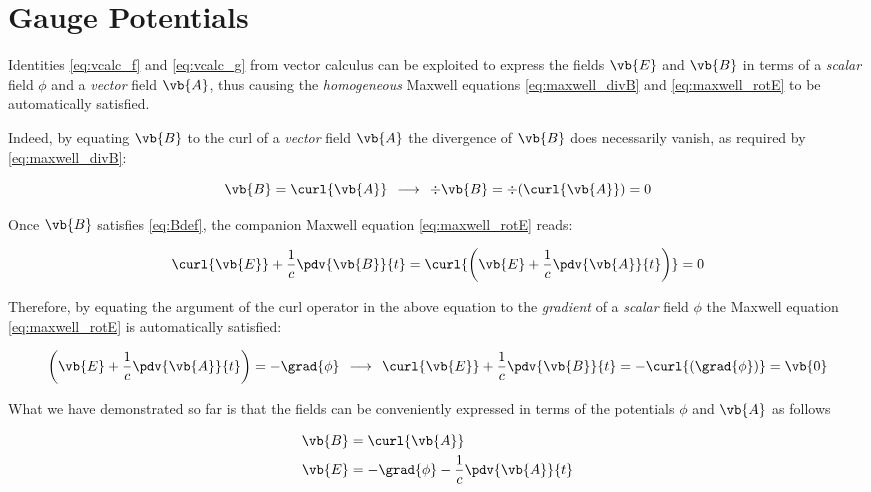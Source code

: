 \section{Gauge Potentials}

Identities \ref{eq:vcalc_f} and \ref{eq:vcalc_g} from vector calculus can be exploited to express the fields $\vb{E}$ and $\vb{B}$ in terms of a \textit{scalar} field $\phi$ and a \textit{vector} field $\vb{A}$, thus causing the \textit{homogeneous} Maxwell equations \ref{eq:maxwell_divB} and \ref{eq:maxwell_rotE} to be automatically satisfied. 

Indeed, by equating $\vb{B}$ to the curl of a \textit{vector} field $\vb{A}$ the divergence of $\vb{B}$ does necessarily vanish, as required by \ref{eq:maxwell_divB}:

\begin{equation}
\vb{B} = \curl{\vb{A}} \:\: \longrightarrow \:\: \div{\vb{B}} = \div{(\curl{\vb{A}})} = 0 \label{eq:Bdef}
\end{equation}
   
Once $\vb{B}$ satisfies \ref{eq:Bdef}, the companion Maxwell equation \ref{eq:maxwell_rotE} reads:

\begin{equation*}
\curl{\vb{E}} + \frac{1}{c} \pdv{\vb{B}}{t} = \curl{\left( \vb{E} + \frac{1}{c} \pdv{\vb{A}}{t} \right)} = 0 
\end{equation*}
 
Therefore, by equating the argument of the curl operator in the above equation to the \textit{gradient} of a \textit{scalar} field $\phi$ the Maxwell equation  \ref{eq:maxwell_rotE} is automatically satisfied:

\begin{equation}
\left( \vb{E} + \frac{1}{c} \pdv{\vb{A}}{t} \right) = - \grad{\phi} \:\: \longrightarrow \:\: \curl{\vb{E}} + \frac{1}{c} \pdv{\vb{B}}{t} = - \curl{(\grad{\phi})} = \vb{0} \label{eq:Edef}
\end{equation}

What we have demonstrated so far is that the fields can be conveniently expressed in terms of the potentials $\phi$ and $\vb{A}$ as follows

\begin{subequations}
\label{eq:potentials_1}
\begin{align}
\vb{B} &= \curl{\vb{A}} \label{eq:potentials_11} \\
\vb{E} &= - \grad{\phi} - \frac{1}{c} \pdv{\vb{A}}{t} \label{eq:potentials_12} 
\end{align}
\end{subequations}

